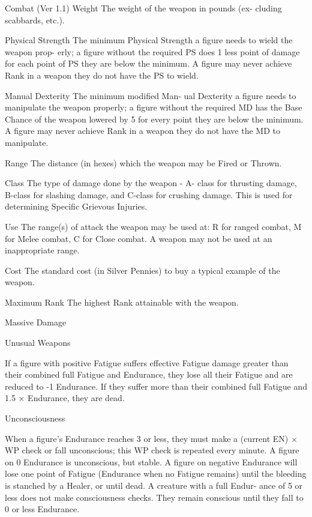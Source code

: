 \begin{Chapter}{Combat (Ver 1.1)}
Weight  The  weight  of  the  weapon  in  pounds  (ex-
cluding scabbards, etc.). 

Physical  Strength  The  minimum  Physical 
Strength a figure needs to wield the weapon prop-
erly;  a  figure  without  the  required  PS  does  1  less 
point  of  damage  for  each  point  of  PS  they  are 
below  the  minimum.  A  figure  may  never  achieve 
Rank in a weapon they do not have the PS to wield. 

Manual  Dexterity  The  minimum  modified  Man-
ual  Dexterity  a  figure  needs  to  manipulate  the 
weapon properly; a figure without the required MD 
has  the  Base  Chance  of  the  weapon  lowered  by  5 
for  every  point  they  are  below  the  minimum.  A 
figure  may  never  achieve  Rank  in  a  weapon  they 
do not have the MD to manipulate. 

Range  The  distance  (in  hexes)  which  the  weapon 
may be Fired or Thrown. 

Class The type of damage done by the weapon - A-
class  for  thrusting  damage,  B-class  for  slashing 
damage,  and  C-class  for  crushing  damage.  This  is 
used for determining Specific Grievous Injuries. 

Use  The  range(s)  of  attack  the  weapon  may  be 
used at: R for ranged combat, M for Melee combat, 
C for Close combat. A weapon may not be used at 
an inappropriate range. 

Cost The standard cost (in Silver Pennies) to buy a 
typical example of the weapon. 

Maximum Rank The highest Rank attainable with 
the weapon. 

Massive Damage 

Unusual Weapons 

If  a  figure  with  positive  Fatigue  suffers  effective 
Fatigue  damage  greater  than  their  combined  full 
Fatigue  and  Endurance,  they  lose  all  their  Fatigue 
and  are  reduced  to  -1  Endurance.  If  they  suffer 
more  than  their  combined  full  Fatigue  and  1.5  × 
Endurance, they are dead. 

Unconsciousness 

When a figure’s Endurance reaches 3 or less, they 
must  make  a  (current  EN)  ×  WP  check  or  fall 
unconscious;  this  WP  check  is  repeated  every 
minute.  A  figure  on  0  Endurance  is  unconscious, 
but  stable.  A  figure  on  negative  Endurance  will 
lose  one  point  of  Fatigue  (Endurance  when  no 
Fatigue remains) until the bleeding is stanched by a 
Healer, or until dead. A creature with a full Endur-
ance  of  5  or  less  does  not  make  consciousness 
checks.  They  remain  conscious until they  fall  to  0 
or less Endurance. 


\end{Chapter}
